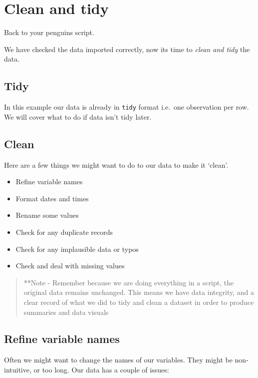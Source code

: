 \documentclass[
]{book}
\begin{document}
\hypertarget{clean-and-tidy}{%
\section{Clean and tidy}\label{clean-and-tidy}}

Back to your penguins script.

We have checked the data imported correctly, now its time to \emph{clean and tidy} the data.

\hypertarget{tidy}{%
\subsection{Tidy}\label{tidy}}

In this example our data is already in \texttt{tidy} format i.e.~one observation per row. We will cover what to do if data isn't tidy later.

\hypertarget{clean}{%
\subsection{Clean}\label{clean}}

Here are a few things we might want to do to our data to make it `clean'.

\begin{itemize}
\item
  Refine variable names
\item
  Format dates and times
\item
  Rename some values
\item
  Check for any duplicate records
\item
  Check for any implausible data or typos
\item
  Check and deal with missing values
\end{itemize}

\begin{quote}
**Note - Remember because we are doing everything in a script, the original data remains unchanged. This means we have data integrity, and a clear record of what we did to tidy and clean a dataset in order to produce summaries and data visuals
\end{quote}

\hypertarget{refine-variable-names}{%
\subsection{Refine variable names}\label{refine-variable-names}}

Often we might want to change the names of our variables. They might be non-intuitive, or too long. Our data has a couple of issues:
\end{document}
